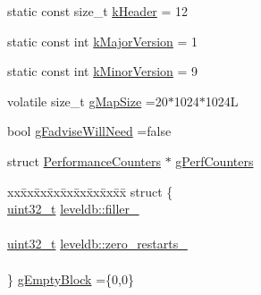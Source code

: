 \begin{DoxyCompactItemize}
\begin{tabbing}
\end{tabbing}\item 
static const size\+\_\+t \hyperlink{namespaceleveldb_a0c307b86a9e098703aa8aa0a55ce504a}{k\+Header} = 12
\item 
static const int \hyperlink{namespaceleveldb_ab5f58e0e9055bf647e6b92dc8b69c11f}{k\+Major\+Version} = 1
\item 
static const int \hyperlink{namespaceleveldb_afba0124470c60dd33b9d82838f40fc04}{k\+Minor\+Version} = 9
\item 
volatile size\+\_\+t \hyperlink{namespaceleveldb_a3ddc2e41a88b19db841ad0899e40c936}{g\+Map\+Size} =20$\ast$1024$\ast$1024\+L
\item 
bool \hyperlink{namespaceleveldb_a4deeaf70179ce1e6f7fee0c17e32f272}{g\+Fadvise\+Will\+Need} =false
\item 
struct \hyperlink{structleveldb_1_1_performance_counters}{Performance\+Counters} $\ast$ \hyperlink{namespaceleveldb_a8aa95dd97d9167fd8c5a015e19e387b8}{g\+Perf\+Counters}
\item 
\begin{tabbing}
xx\=xx\=xx\=xx\=xx\=xx\=xx\=xx\=xx\=\kill
struct \{\\
\>\hyperlink{stdint_8h_a435d1572bf3f880d55459d9805097f62}{uint32\_t} \hyperlink{namespaceleveldb_a3521934daf5e6b167206c789df9a1a18}{leveldb::filler\_}\\
\>\\
\>\hyperlink{stdint_8h_a435d1572bf3f880d55459d9805097f62}{uint32\_t} \hyperlink{namespaceleveldb_a361a49a125732028845c84785fd92f23}{leveldb::zero\_restarts\_}\\
\>\\
\} \hyperlink{namespaceleveldb_a399bfb270c13d13ad936e382957db021}{gEmptyBlock} =\{0,0\}\\


\end{tabbing}
\end{DoxyCompactItemize}

